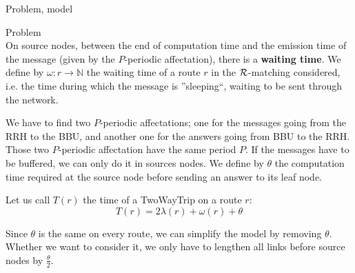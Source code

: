 \documentclass[a4paper,10pt]{report}
\begin{document}
\begin{chapter}{Problem, model}
\begin{section}{Problem}
\\

On source nodes, between the end of computation time and the emission time of the message (given by the $P$-periodic affectation), there is a {\bf waiting time}. 
We define by $\omega: r \rightarrow \mathbb{N}$ the waiting time of a route $r$ in the ${\cal R}$-matching considered, i.e. the time during which the
message is ''sleeping``, waiting to be sent through the network.


We have to find two $P$-periodic affectations; one for the messages going from the RRH to the BBU, and another one for the answers going from BBU to the RRH. Those two $P$-periodic affectation have the same period $P$. 
If the messages have to be buffered, we can only do it in sources nodes.
We define by $\theta$ the computation time required at the source node before sending an answer to its leaf node.

Let us call $T (r)$ the time of a TwoWayTrip on a route $r$: $$ T (r) = 2\lambda (r) + \omega (r) + \theta$$

Since $\theta$ is the same on every route, we can simplify the model by removing $\theta$. Whether we want to consider it, we only have to lengthen all 
links before source nodes by $\frac{\theta}{2}$. 



\end{section}
\end{chapter}
\end{document}
